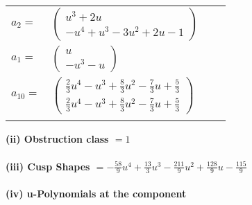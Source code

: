 \documentclass[1p]{elsarticle_modified}
\theoremstyle{definition}
\begin{document}
\begin{tabular}{m{7pt} m{180pt} m{7pt} m{180pt} }
\flushright $a_{2}=$&$\begin{pmatrix}u^3+2 u\\- u^4+u^3-3 u^2+2 u-1\end{pmatrix}$ \\
\flushright $a_{1}=$&$\begin{pmatrix}u\\- u^3- u\end{pmatrix}$ \\
\flushright $a_{10}=$&$\begin{pmatrix}\frac{2}{3} u^4- u^3+\frac{8}{3} u^2-\frac{7}{3} u+\frac{5}{3}\\\frac{2}{3} u^4- u^3+\frac{8}{3} u^2-\frac{7}{3} u+\frac{5}{3}\end{pmatrix}$\\&\end{tabular}
\flushleft \textbf{(ii) Obstruction class $= 1$}\\~\\
\flushleft \textbf{(iii) Cusp Shapes $= -\frac{58}{9} u^4+\frac{13}{3} u^3-\frac{211}{9} u^2+\frac{128}{9} u-\frac{115}{9}$}\\~\\
\newpage\renewcommand{\arraystretch}{1}
\flushleft \textbf{(iv) u-Polynomials at the component}\newline \\
\end{document}
